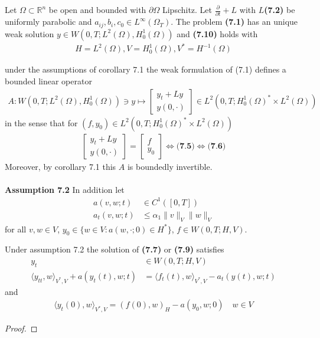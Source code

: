 \begin{corollary}
	Let $\Omega \subset \mathbb{R}^n$ be open and bounded with $\partial\Omega$ Lipschitz. Let $\frac{\partial}{\partial t} + L$ with $L$\textbf{(7.2)} be uniformly parabolic and $a_{ij}, b_i, c_0 \in L^\infty(\Omega_T)$. The problem \textbf{(7.1)} has an unique weak solution $y \in W(0, T; L^2(\Omega), H_0^1(\Omega))$ and \textbf{(7.10)} holds with
	\begin{align*}
		H = L^2(\Omega), V = H_0^1(\Omega), V^* = H^{-1}(\Omega)
	\end{align*}
\end{corollary}

under the assumptions of corollary 7.1 the weak formulation of (7.1) defines a bounded linear operator 
\begin{align*}
	A: W(0, T; L^2(\Omega), H^1_0(\Omega)) \ni y \mapsto 
	\begin{bmatrix}
		y_t + Ly \\
		y(0, \cdot )
	\end{bmatrix}
	\in L^2(0, T; H^1_0(\Omega)^* \times L^2(\Omega))
\end{align*}
in the sense that for $(f, y_0) \in L^2(0, T; H^1_0(\Omega)^* \times L^2(\Omega))$
\begin{align*}
	\begin{bmatrix}
		y_t + Ly \\
		y(0, \cdot)
	\end{bmatrix}
	= 
	\begin{bmatrix}
		f\\
		y_0
	\end{bmatrix}
	\Leftrightarrow
	\textbf{(7.5)}
	\Leftrightarrow
	\textbf{(7.6)}
\end{align*}
Moreover, by corollary 7.1 this $A$ is boundedly invertible. \\
\quad\\
\textbf{Assumption 7.2} In addition let 
\begin{align*}
	a(v, w; t) &\in C^1([0, T])\\ 
	a_t (v, w ; t) &\le \alpha_1\|v\|_V\|w\|_V
\end{align*}
for all $v, w \in V$, $y_0 \in \{w \in V: a(w, \cdot; 0) \in H^* \}$, $f \in W(0, T; H, V)$. 

\begin{theorem}
	Under assumption 7.2 the solution of \textbf{(7.7)} or \textbf{(7.9)} satisfies 
	\begin{align*}
		y_t &\in W(0, T; H, V) \\
		\langle y_{tt}, w \rangle_{V^*, V} + a(y_t(t), w; t) &= \langle f_t(t), w \rangle_{V^*, V} - a_t(y(t), w; t)
	\end{align*}
	and 
	\begin{align*}
		\langle y_t(0), w \rangle_{V^*, V} = (f(0), w )_H - a(y_0, w; 0) \quad w \in V
	\end{align*}
\end{theorem}
\begin{proof}
\end{proof}

